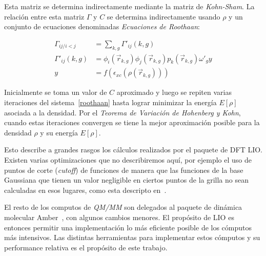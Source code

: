 Esta matriz se determina indirectamente mediante la matriz de \textit{Kohn-Sham}. La
relaci\'on entre esta matriz $\Gamma$ y $C$ se determina indirectamente usando $\rho$
y un conjunto de ecuaciones denominadas \textit{Ecuaciones de Roothaan}:

\begin{align}
    \label{roothaan}
    \Gamma_{ij/ i < j} & = \sum_{k,g} \Gamma'_{ij}(k,g) \\
    \Gamma'_{ij} (k,g) & = \phi_i (\vec{r}_{k,g}) \phi_j (\vec{r}_{k,g}) p_k(\vec{r}_{k,g}) \omega'_g y \\
    y & = f(\epsilon_{xc}(\rho(\vec{r}_{k,g}))) 
\end{align}

Inicialmente se toma un valor de $C$ aproximado y luego se repiten varias iteraciones
del sistema~\ref{roothaan} hasta lograr minimizar la energ\'ia $E[\rho]$ asociada
a la densidad. Por el \textit{Teorema de Variaci\'on de Hohenberg y Kohn}, cuando
estas iteraciones convergen se tiene la mejor aproximaci\'on posible para la
densidad $\rho$ y su energ\'ia $E[\rho]$.

Esto describe a grandes rasgos los c\'alculos realizados por el paquete de DFT
LIO. Existen varias optimizaciones que no describiremos aqu\'i, por ejemplo el uso de
puntos de corte (\textit{cutoff}) de funciones de manera que las funciones de la
base Gaussiana que tienen un valor negligible en ciertos puntos de la grilla no
sean calculadas en esos lugares, como esta descripto en~\cite{PaperNitscheManu}.

El resto de los computos de \textit{QM/MM} son delegados al paquete de din\'amica
molecular Amber~\cite{Amber}, con algunos cambios menores. El prop\'osito de LIO es
entonces permitir una implementaci\'on lo m\'as eficiente posible de los c\'omputos
m\'as intensivos. Las distintas herramientas para implementar estos c\'omputos y
su performance relativa es el prop\'osito de este trabajo.

